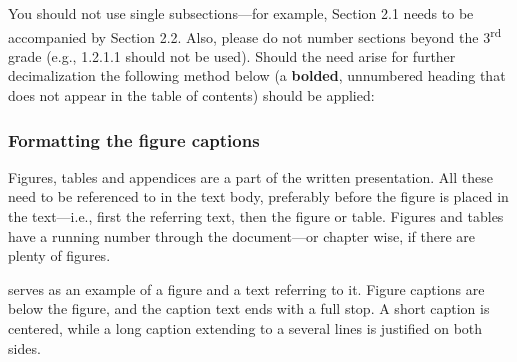 You should not use single subsections---for example, Section 2.1
needs to be accompanied by Section 2.2. Also, please do not number
sections beyond the 3\textsuperscript{rd}  grade (e.g., 1.2.1.1
should not be used). Should the need arise for further decimalization
the following method below (a \textbf{bolded}, unnumbered heading
that does not appear in the table of contents) should be applied:

\subsubsection{Formatting the figure captions}
Figures, tables and appendices are a part of the written
presentation. All these need to be referenced to in the text body,
preferably before the figure is placed in the text---i.e., first the
referring text, then the figure or table. Figures and tables have a
running number through the document---or chapter wise, if there are
plenty of figures. \DIFdelbegin %

\DIFdelend {} serves as an example of a figure and a
text referring to it. Figure captions are below the figure, and the
caption text ends with a full stop. A short caption is centered,
while a long caption extending to a several lines is justified on both sides.
\DIFdelbegin {}\textbf{} %
\textbf{%
} %
\DIFdelend 

